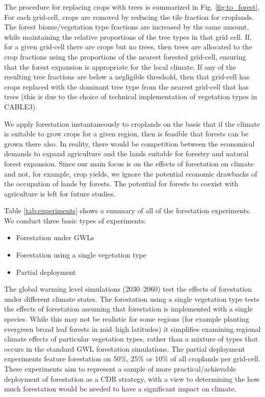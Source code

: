 \documentclass[]{article}
\begin{document}
The procedure for replacing crops with trees is summarized in Fig. \ref{fig:to_forest}.
For each grid-cell, crops are removed by reducing the tile fraction for croplands.
The forest biome/vegetation type fractions are increased by the same amount, while maintaining the relative proportions of the tree types in that grid cell.
If, for a given grid-cell there are crops but no trees, then trees are allocated to the crop fractions using the proportions of the nearest forested grid-cell, ensuring that the forest expansion is appropriate for the local climate.
If any of the resulting tree fractions are below a negligible threshold, then that grid-cell has crops replaced with the dominant tree type from the nearest grid-cell that has trees (this is due to the choice of technical implementation of vegetation types in CABLE3).

We apply forestation instantaneously to croplands on the basis that if the climate is suitable to grow crops for a given region, then is feasible that forests can be grown there also. In reality, there would be competition between the economical demands to expand agriculture and the lands suitable for forestry and natural forest expansion.
Since our main focus is on the effects of forestation on climate and not, for example, crop yields, we ignore the potential economic drawbacks of the occupation of lands by forests.
The potential for forests to coexist with agriculture is left for future studies.

Table \ref{tab:experiments} shows a summary of all of the forestation experiments. We conduct three basic types of experiments:

\begin{itemize}
    \item Forestation under GWLs
    \item Forestation using a single vegetation type
    \item Partial deployment
\end{itemize}

The global warming level simulations (2030–2060) test the effects of forestation under different climate states.
The forestation using a single vegetation type tests the effects of forestation assuming that forestation is implemented with a single species.
While this may not be realistic for some regions (for example planting evergreen broad leaf forests in mid–high latitudes) it simplifies examining regional climate effects of particular vegetation types, rather than a mixture of types that occurs in the standard GWL forestation simulations.
The partial deployment experiments feature forestation on 50\%, 25\% or 10\% of all croplands per grid-cell.
These experiments aim to represent a sample of more practical/achievable deployment of forestation as a CDR strategy, with a view to determining the how much forestation would be needed to have a significant impact on climate.
\end{document}
